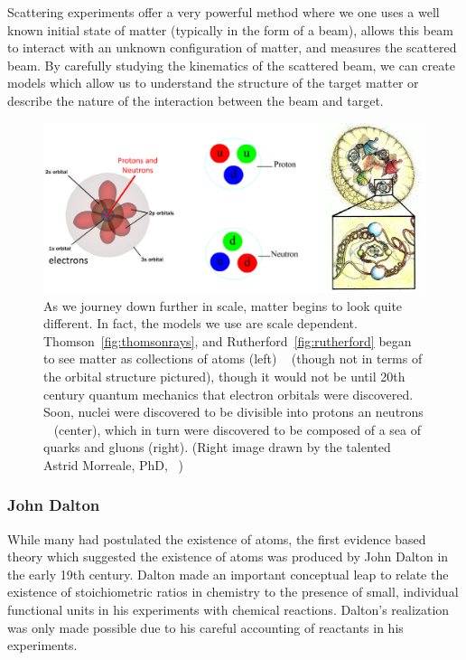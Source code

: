 Scattering experiments offer a very powerful method where we one uses a well
known initial state of matter (typically in the form of a beam), allows this
beam to interact with an unknown configuration of matter, and measures the
scattered beam. By carefully studying the kinematics of the scattered beam, we
can create models which allow us to understand the structure of the target
matter or describe the nature of the interaction between the beam and target. 

\begin{figure}[ht]
	\centering
	\includegraphics[width=\linewidth]{../Chapter2/fig/scale_of_matter.png}
	\caption{
		As we journey down further in scale, matter begins to look quite different.
		In fact, the models we use are scale dependent.
		Thomson~\ref{fig:thomsonrays}, and Rutherford~\ref{fig:rutherford} began to
		see matter as collections of atoms (left) ~\cite{Freudenrich2001} (though
		not in terms of the orbital structure pictured), though it would not be
		until 20th century quantum mechanics that electron orbitals were
		discovered.  Soon, nuclei were discovered to be divisible into protons an
		neutrons ~\cite{Manisearth2010} (center), which in turn were discovered to
		be composed of a sea of quarks and gluons (right). (Right image drawn by
		the talented Astrid Morreale, PhD, ~\cite{Morreale2009})
	}
	\label{fig:scale_of_matter}
\end{figure}

\subsubsection{John Dalton}

While many had postulated the existence of atoms, the first evidence based
theory which suggested the existence of atoms was produced by John Dalton in the
early 19th century. Dalton made an important conceptual leap to relate the
existence of stoichiometric ratios in chemistry to the presence of small,
individual functional units in his experiments with chemical reactions.
Dalton's realization was only made possible due to his careful accounting of
reactants in his experiments.

